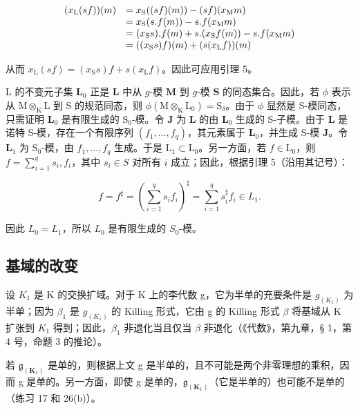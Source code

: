 \[
\begin{array}{r l} (x _ {\mathrm{L}} (s f)) (m) & = x _ {\mathrm{S}} ((s f) (m)) - (s f) (x _ {\mathrm{M}} m) \\ & = x _ {\mathrm{S}} (s. f (m)) - s. f (x _ {\mathrm{M}} m) \\ & = (x _ {\mathrm{S}} s). f (m) + s. (x _ {\mathrm{S}} f (m)) - s. f (x _ {\mathrm{M}} m) \\ & = ((x _ {\mathrm{S}} s) f) (m) + (s (x _ {\mathrm{L}} f)) (m) \end{array}
\]

从而 \(x_{\mathrm{L}}(sf) = (x_{\mathrm{S}}s)f + s(x_{\mathrm{L}}f)\)。因此可应用引理 5。

L 的不变元子集 \(\mathbf{L}_0\) 正是 \(\mathbf{L}\) 中从 \(g\)-模 \(\mathbf{M}\) 到 \(g\)-模 \(\mathbf{S}\) 的同态集合。因此，若 \(\phi\) 表示从 \(\mathrm{M} \otimes_{\mathrm{K}} \mathrm{L}\) 到 \(\mathrm{S}\) 的规范同态，则 \(\phi(\mathrm{M} \otimes_{\mathrm{K}} \mathrm{L}_0) = \mathrm{S}_{\delta}\)。由于 \(\phi\) 显然是 S-模同态，只需证明 \(\mathbf{L}_0\) 是有限生成的 \(\mathrm{S}_0\)-模。令 \(\mathbf{J}\) 为 \(\mathbf{L}\) 的由 \(\mathbf{L}_0\) 生成的 S-子模。由于 \(\mathbf{L}\) 是诺特 S-模，存在一个有限序列 \((f_1, \ldots, f_q)\)，其元素属于 \(\mathbf{L}_0\)，并生成 S-模 \(\mathbf{J}\)。令 \(\mathbf{L}_1\) 为 \(\mathrm{S}_0\)-模，由 \(f_{1},\ldots ,f_{q}\) 生成。于是 \(\mathrm{L}_1\subset \mathrm{L}_0\)。另一方面，若 \(f\in \mathrm{L}_0\)，则 \(f = \sum_{i = 1}^{q}s_{i},f_{i}\)，其中 \(s_i\in S\) 对所有 \(i\) 成立；因此，根据引理 5（沿用其记号）：

\[
f = f ^ {\sharp} = \left(\sum_ {i = 1} ^ {q} s _ {i} f _ {i}\right) ^ {\sharp} = \sum_ {i = 1} ^ {q} s _ {i} ^ {\sharp} f _ {i} \in L _ {1}.
\]

因此 \(L_{0} = L_{1}\)，所以 \(L_{0}\) 是有限生成的 \(S_{0}\)-模。

\subsection{基域的改变}

设 \(K_{1}\) 是 K 的交换扩域。对于 K 上的李代数 g，它为半单的充要条件是 \(g_{(K_{1})}\) 为半单；因为 \(\beta_{1}\) 是 \(g_{(K_{1})}\) 的 Killing 形式，它由 g 的 Killing 形式 \(\beta\) 将基域从 K 扩张到 \(K_{1}\) 得到；因此，\(\beta_{1}\) 非退化当且仅当 \(\beta\) 非退化（《代数》，第九章，§ 1，第 4 号，命题 3 的推论）。

若 \(\mathfrak{g}_{(\mathbf{K}_{1})}\) 是单的，则根据上文 g 是半单的，且不可能是两个非零理想的乘积，因而 g 是单的。另一方面，即使 g 是单的，\(\mathfrak{g}_{(\mathbf{K}_{1})}\)（它是半单的）也可能不是单的（练习 17 和 26(b)）。

